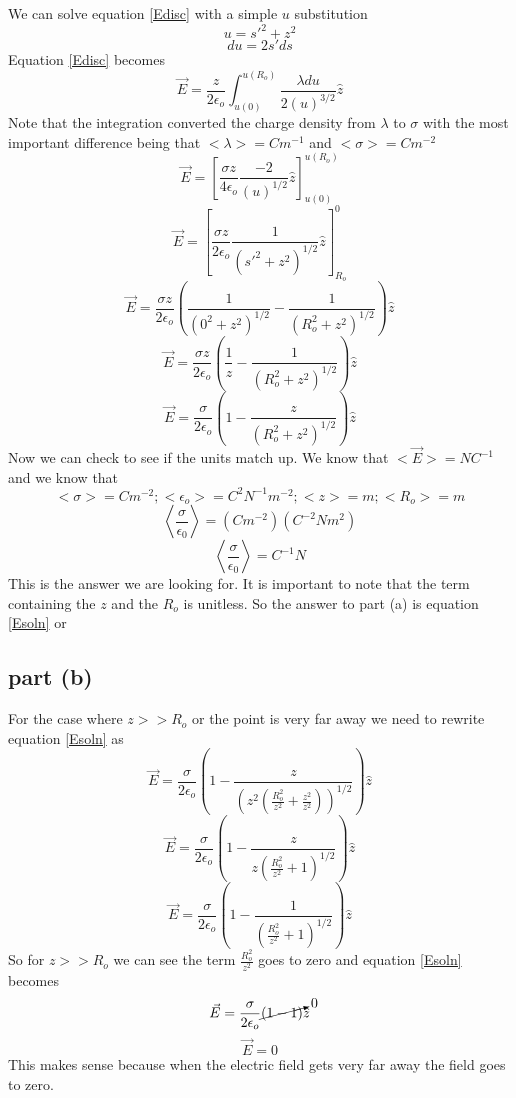 \documentclass[11pt]{article}
\numberwithin{equation}{section}
\begin{document}
We can solve equation \ref{Edisc} with a simple $u$ substitution
$$u = s'^2 + z^2$$
$$du = 2s'ds$$
Equation \ref{Edisc} becomes
$$\vec{E} = \frac{z}{2\epsilon_o}\int_{u(0)}^{u(R_o)} \frac{\lambda du}{2(u)^{3/2}} \hat{z}$$
Note that the integration converted the charge density from $\lambda$ to $\sigma$ with the most important difference being that $<\lambda> = C m^{-1}$ and $<\sigma> = C m^{-2}$
$$\vec{E} = \left[\frac{\sigma z}{4\epsilon_o} \frac{-2}{(u)^{1/2}} \hat{z}\right]_{u(0)}^{u(R_o)}$$
$$\vec{E} = \left[\frac{\sigma z}{2\epsilon_o} \frac{1}{(s'^2 + z^2)^{1/2}} \hat{z}\right]^{0}_{R_o}$$
$$\vec{E} = \frac{\sigma z}{2\epsilon_o}\left(\frac{1}{(0^2 + z^2)^{1/2}} - \frac{1}{(R_o^2 + z^2)^{1/2}} \right)\hat{z}$$
$$\vec{E} = \frac{\sigma z}{2\epsilon_o}\left(\frac{1}{z} - \frac{1}{(R_o^2 + z^2)^{1/2}} \right)\hat{z}$$
\begin{equation}
\vec{E} = \frac{\sigma }{2\epsilon_o}\left(1 - \frac{z}{(R_o^2 + z^2)^{1/2}} \right)\hat{z}
\label{Esoln}
\end{equation}
Now we can check to see if the units match up. We know that $<\vec{E}> = N C^{-1}$ and we know that
$$<\sigma> = C m^{-2}; <\epsilon_o> = C^2 N^{-1}m^{-2}; <z> = m; <R_o> = m$$
$$\left<\frac{\sigma}{\epsilon_0}\right> = (C m^{-2})(C^{-2}Nm^2)$$
$$\left<\frac{\sigma}{\epsilon_0}\right> = C^{-1}N$$
This is the answer we are looking for. It is important to note that the term containing the $z$ and the $R_o$ is unitless. So the answer to part (a) is equation \ref{Esoln} or
\begin{center}
\end{center}
\subsection{part (b)}
For the case where $z >> R_o$ or the point is very far away we need to rewrite equation \ref{Esoln} as
$$\vec{E} = \frac{\sigma }{2\epsilon_o}\left(1 - \frac{z}{(z^2(\frac{R_o^2}{z^2} + \frac{z^2}{z^2}))^{1/2}} \right)\hat{z}$$
$$\vec{E} = \frac{\sigma }{2\epsilon_o}\left(1 - \frac{z}{z(\frac{R_o^2}{z^2} + 1)^{1/2}} \right)\hat{z}$$
$$\vec{E} = \frac{\sigma }{2\epsilon_o}\left(1 - \frac{1}{(\frac{R_o^2}{z^2} + 1)^{1/2}} \right)\hat{z}$$
So for $z >> R_o$ we can see the term $\frac{R_o^2}{z^2}$ goes to zero and equation \ref{Esoln} becomes
$$\vec{E} = \frac{\sigma }{2\epsilon_o}\cancelto{0}{(1 - 1)}\hat{z}$$
$$\vec{E} = 0 $$
This makes sense because when the electric field gets very far away the field goes to zero.
\end{document}
